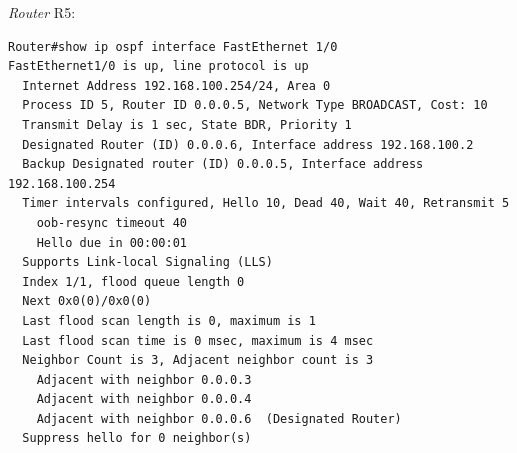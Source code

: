 \emph{Router} \textsf{R5}:
\begin{verbatim}
Router#show ip ospf interface FastEthernet 1/0
FastEthernet1/0 is up, line protocol is up 
  Internet Address 192.168.100.254/24, Area 0 
  Process ID 5, Router ID 0.0.0.5, Network Type BROADCAST, Cost: 10
  Transmit Delay is 1 sec, State BDR, Priority 1 
  Designated Router (ID) 0.0.0.6, Interface address 192.168.100.2
  Backup Designated router (ID) 0.0.0.5, Interface address 192.168.100.254
  Timer intervals configured, Hello 10, Dead 40, Wait 40, Retransmit 5
    oob-resync timeout 40
    Hello due in 00:00:01
  Supports Link-local Signaling (LLS)
  Index 1/1, flood queue length 0
  Next 0x0(0)/0x0(0)
  Last flood scan length is 0, maximum is 1
  Last flood scan time is 0 msec, maximum is 4 msec
  Neighbor Count is 3, Adjacent neighbor count is 3 
    Adjacent with neighbor 0.0.0.3
    Adjacent with neighbor 0.0.0.4
    Adjacent with neighbor 0.0.0.6  (Designated Router)
  Suppress hello for 0 neighbor(s)
\end{verbatim}

